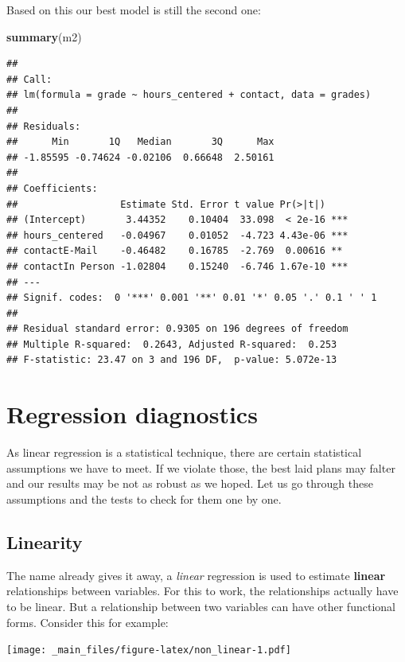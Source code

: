 \documentclass[
]{book}
\newenvironment{Shaded}{\begin{snugshade}}{\end{snugshade}}
\newcommand{\FunctionTok}[1]{\textcolor[rgb]{0.13,0.29,0.53}{\textbf{#1}}}
\newcommand{\NormalTok}[1]{#1}
\begin{document}
Based on this our best model is still the second one:

\begin{Shaded}
\begin{Highlighting}[]
\FunctionTok{summary}\NormalTok{(m2)}
\end{Highlighting}
\end{Shaded}

\begin{verbatim}
## 
## Call:
## lm(formula = grade ~ hours_centered + contact, data = grades)
## 
## Residuals:
##      Min       1Q   Median       3Q      Max 
## -1.85595 -0.74624 -0.02106  0.66648  2.50161 
## 
## Coefficients:
##                  Estimate Std. Error t value Pr(>|t|)    
## (Intercept)       3.44352    0.10404  33.098  < 2e-16 ***
## hours_centered   -0.04967    0.01052  -4.723 4.43e-06 ***
## contactE-Mail    -0.46482    0.16785  -2.769  0.00616 ** 
## contactIn Person -1.02804    0.15240  -6.746 1.67e-10 ***
## ---
## Signif. codes:  0 '***' 0.001 '**' 0.01 '*' 0.05 '.' 0.1 ' ' 1
## 
## Residual standard error: 0.9305 on 196 degrees of freedom
## Multiple R-squared:  0.2643, Adjusted R-squared:  0.253 
## F-statistic: 23.47 on 3 and 196 DF,  p-value: 5.072e-13
\end{verbatim}

\hypertarget{regression-diagnostics}{%
\section{Regression diagnostics}\label{regression-diagnostics}}

As linear regression is a statistical technique, there are certain statistical assumptions we have to meet. If we violate those, the best laid plans may falter and our results may be not as robust as we hoped. Let us go through these assumptions and the tests to check for them one by one.

\hypertarget{linearity}{%
\subsection{Linearity}\label{linearity}}

The name already gives it away, a \emph{linear} regression is used to estimate \textbf{linear} relationships between variables. For this to work, the relationships actually have to be linear. But a relationship between two variables can have other functional forms. Consider this for example:

\texttt{[image: \_main\_files/figure-latex/non\_linear-1.pdf]}
\end{document}
